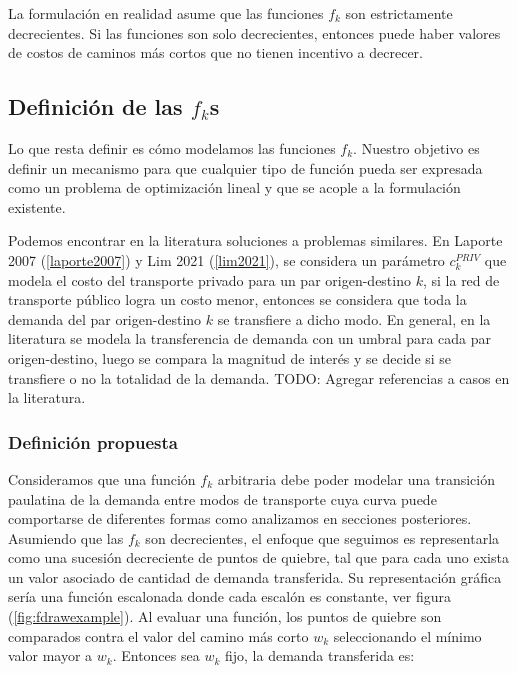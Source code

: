 \documentclass{article}
\begin{document}
  La formulación en realidad asume que las funciones $f_k$ son estrictamente decrecientes. Si las funciones son solo decrecientes, entonces puede haber valores de costos de caminos más cortos que no tienen incentivo a decrecer.

  \subsection{Definición de las $f_k$s}

  Lo que resta definir es cómo modelamos las funciones $f_k$. Nuestro objetivo es definir un mecanismo para que cualquier tipo de función pueda ser expresada como un problema de optimización lineal y que se acople a la formulación existente.

  Podemos encontrar en la literatura soluciones a problemas similares. En Laporte 2007 (\ref{laporte2007}) y Lim 2021 (\ref{lim2021}), se considera un parámetro $c^{PRIV}_k$ que modela el costo del transporte privado para un par origen-destino $k$, si la red de transporte público logra un costo menor, entonces se considera que toda la demanda del par origen-destino $k$ se transfiere a dicho modo. En general, en la literatura se modela la transferencia de demanda con un umbral para cada par origen-destino, luego se compara la magnitud de interés y se decide si se transfiere o no la totalidad de la demanda. TODO: Agregar referencias a casos en la literatura.

  \subsubsection{Definición propuesta}

  Consideramos que una función $f_k$ arbitraria debe poder modelar una transición paulatina de la demanda entre modos de transporte cuya curva puede comportarse de diferentes formas como analizamos en secciones posteriores. Asumiendo que las $f_k$ son decrecientes, el enfoque que seguimos es representarla como una sucesión decreciente de puntos de quiebre, tal que para cada uno exista un valor asociado de cantidad de demanda transferida. Su representación gráfica sería una función escalonada donde cada escalón es constante, ver figura (\ref{fig:fdrawexample}). Al evaluar una función, los puntos de quiebre son comparados contra el valor del camino más corto $w_k$ seleccionando el mínimo valor mayor a $w_k$. Entonces sea $w_k$ fijo, la demanda transferida es:
\end{document}
